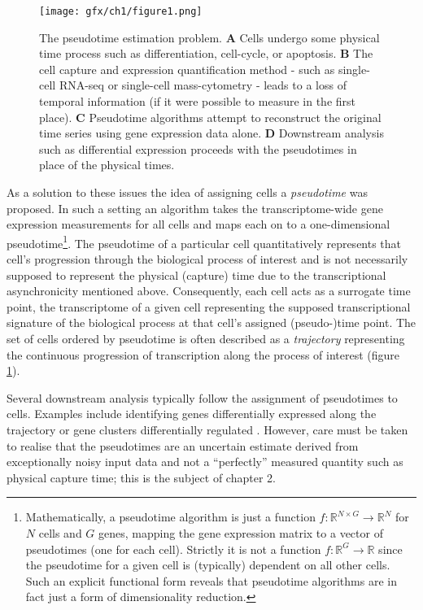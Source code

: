\begin{figure}
\centering
  \texttt{[image: gfx/ch1/figure1.png]}
  \caption[The pseudotime estimation problem.]{The pseudotime estimation problem.
\textbf{A} Cells undergo some physical time process such as differentiation, cell-cycle, or apoptosis.
\textbf{B} The cell capture and expression quantification method - such as single-cell RNA-seq or single-cell mass-cytometry - leads to a loss of temporal information (if it were possible to measure in the first place).
\textbf{C} Pseudotime algorithms attempt to reconstruct the original time series using gene expression data alone.
\textbf{D} Downstream analysis such as differential expression proceeds with the pseudotimes in place of the physical times.
  } \label{fig:pseudotime}
\end{figure}

As a solution to these issues the idea of assigning cells a \emph{pseudotime} was proposed. In such a setting an algorithm takes the transcriptome-wide gene expression measurements for all cells and maps each on to a one-dimensional pseudotime\footnote{Mathematically, a pseudotime algorithm is just a function $f: \mathbb{R}^{N\times G} \rightarrow \mathbb{R}^N$ for $N$ cells and $G$ genes, mapping the gene expression matrix to a vector of pseudotimes (one for each cell). Strictly it is not a function $f: \mathbb{R}^G \rightarrow \mathbb{R}$ since the pseudotime for a given cell is (typically) dependent on all other cells. Such an explicit functional form reveals that pseudotime algorithms are in fact just a form of dimensionality reduction.}.
The pseudotime of a particular cell quantitatively represents that cell's progression through the biological process of interest and is not necessarily supposed to represent the physical (capture) time due to the transcriptional asynchronicity mentioned above. Consequently, each cell acts as a surrogate time point, the transcriptome of a given cell representing the supposed transcriptional signature of the biological process at that cell's assigned (pseudo-)time point. The set of cells ordered by pseudotime is often described as a \emph{trajectory} representing the continuous progression of transcription along the process of interest (figure \ref{fig:pseudotime}).

Several downstream analysis typically follow the assignment of pseudotimes to cells. Examples include identifying genes differentially expressed along the trajectory \cite{campbell2016switchde} or gene clusters differentially regulated \cite{Trapnell2014-xi}. However, care must be taken to realise that the pseudotimes are an uncertain estimate derived from exceptionally noisy input data and not a ``perfectly'' measured quantity such as physical capture time; this is the subject of chapter 2.

